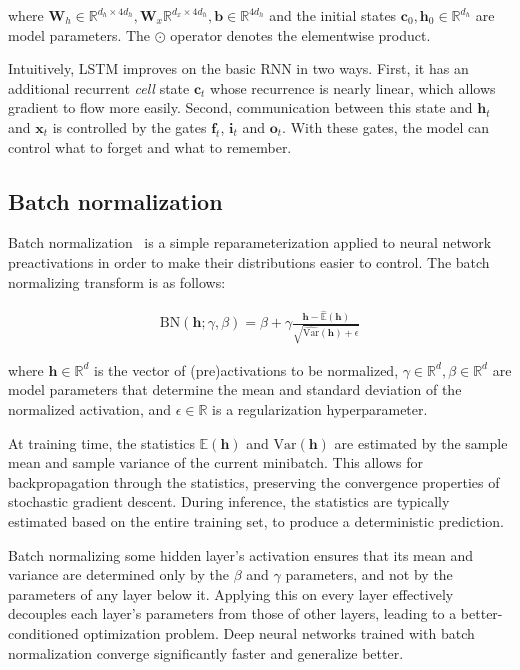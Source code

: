\documentclass{article} %
\newcommand{\vect}[1]{\mathbf{#1}}
\newcommand{\ewprod}{\odot}
\newcommand{\reals}{\mathbb{R}}
\begin{document}
where $\vect{W}_h \in \reals^{d_h \times 4 d_h}, \vect{W}_x \reals^{d_x \times 4 d_h}, \vect{b} \in \reals^{4 d_h}$ and the initial states $\vect{c}_0, \vect{h}_0 \in \reals^{d_h}$ are model parameters.
The $\ewprod$ operator denotes the elementwise product.

Intuitively, LSTM improves on the basic RNN in two ways.
First, it has an additional recurrent \emph{cell} state $\vect{c}_t$ whose recurrence is nearly linear, which allows gradient to flow more easily.
Second, communication between this state and $\vect{h}_t$ and $\vect{x}_t$ is controlled by the gates $\vect{f}_t$, $\vect{i}_t$ and $\vect{o}_t$.
With these gates, the model can control what to forget and what to remember.

\subsection{Batch normalization}

Batch normalization~\cite{batchnorm} is a simple reparameterization applied to neural network preactivations in order to make their distributions easier to control.
The batch normalizing transform is as follows:

\begin{align}
\mathrm{BN}(\vect{h}; \gamma, \beta) =
  \beta + \gamma
  \frac{\vect{h} -   \widehat{\mathbb{E}}(\vect{h})}
       {       \sqrt{\widehat{\mathrm{Var }}(\vect{h}) + \epsilon}}
\end{align}

where $\vect{h} \in \reals^d$ is the vector of (pre)activations to be normalized, $\gamma \in \reals^d, \beta \in \reals^d$ are model parameters that determine the mean and standard deviation of the normalized activation, and $\epsilon \in \reals$ is a regularization hyperparameter.

At training time, the statistics $\mathbb{E}(\vect{h})$ and $\mathrm{Var}(\vect{h})$ are estimated by the sample mean and sample variance of the current minibatch.
This allows for backpropagation through the statistics, preserving the convergence properties of stochastic gradient descent.
During inference, the statistics are typically estimated based on the entire training set, to produce a deterministic prediction.

Batch normalizing some hidden layer's activation ensures that its mean and variance are determined only by the $\beta$ and $\gamma$ parameters, and not by the parameters of any layer below it.
Applying this on every layer effectively decouples each layer's parameters from those of other layers, leading to a better-conditioned optimization problem.
Deep neural networks trained with batch normalization converge significantly faster and generalize better.
\end{document}
